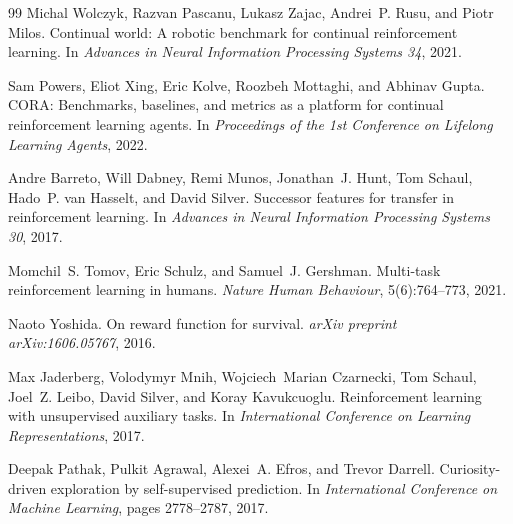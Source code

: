 \documentclass{article}
\begin{document}
\begin{thebibliography}{99}
Michal Wolczyk, Razvan Pascanu, Lukasz Zajac, Andrei~P. Rusu, and Piotr Milos.
\newblock Continual world: A robotic benchmark for continual reinforcement
  learning.
\newblock In \emph{Advances in Neural Information Processing Systems 34}, 2021.

Sam Powers, Eliot Xing, Eric Kolve, Roozbeh Mottaghi, and Abhinav Gupta.
\newblock CORA: Benchmarks, baselines, and metrics as a platform for continual
  reinforcement learning agents.
\newblock In \emph{Proceedings of the 1st Conference on Lifelong Learning
  Agents}, 2022.

Andre Barreto, Will Dabney, Remi Munos, Jonathan~J. Hunt, Tom Schaul, Hado~P.
  van Hasselt, and David Silver.
\newblock Successor features for transfer in reinforcement learning.
\newblock In \emph{Advances in Neural Information Processing Systems 30}, 2017.

Momchil~S. Tomov, Eric Schulz, and Samuel~J. Gershman.
\newblock Multi-task reinforcement learning in humans.
\newblock \emph{Nature Human Behaviour}, 5(6):764--773, 2021.

Naoto Yoshida.
\newblock On reward function for survival.
\newblock \emph{arXiv preprint arXiv:1606.05767}, 2016.

Max Jaderberg, Volodymyr Mnih, Wojciech~Marian Czarnecki, Tom Schaul, Joel~Z.
  Leibo, David Silver, and Koray Kavukcuoglu.
\newblock Reinforcement learning with unsupervised auxiliary tasks.
\newblock In \emph{International Conference on Learning Representations}, 2017.

Deepak Pathak, Pulkit Agrawal, Alexei~A. Efros, and Trevor Darrell.
\newblock Curiosity-driven exploration by self-supervised prediction.
\newblock In \emph{International Conference on Machine Learning}, pages
  2778--2787, 2017.

\end{thebibliography}
\end{document}
